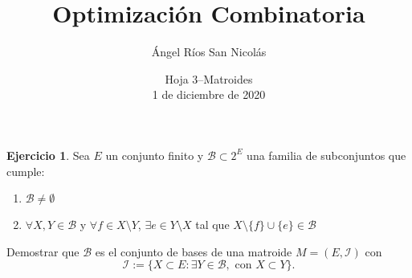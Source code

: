 \documentclass[10pt]{article}
\author{Ángel Ríos San Nicolás}
\title{Optimización Combinatoria}
\date{Hoja 3--Matroides\\ 1 de diciembre de 2020}
\theoremstyle{definition}
\newtheorem{ejer}{Ejercicio}
\begin{document}
\maketitle

\begin{ejer} Sea $E$ un conjunto finito y $\mathcal{B}\subset 2^E$ una familia de subconjuntos que cumple:
\begin{enumerate}[labelindent=\parindent, label=(B\arabic*), ref=\arabic*]
\item $\mathcal{B}\neq \emptyset$
\item $\forall X,Y\in\mathcal{B}$ y $\forall f\in X\setminus Y$, $\exists e\in Y\setminus X$ tal que $X\setminus\{f\}\cup \{e\}\in \mathcal{B}$
\end{enumerate} 
Demostrar que $\mathcal{B}$ es el conjunto de bases de una matroide $M=(E,\mathcal{I})$ con
$$\mathcal{I}:=\{X\subset E : \exists Y\in\mathcal{B},\text{ con } X\subset Y\}.$$
\end{ejer}
\end{document}
